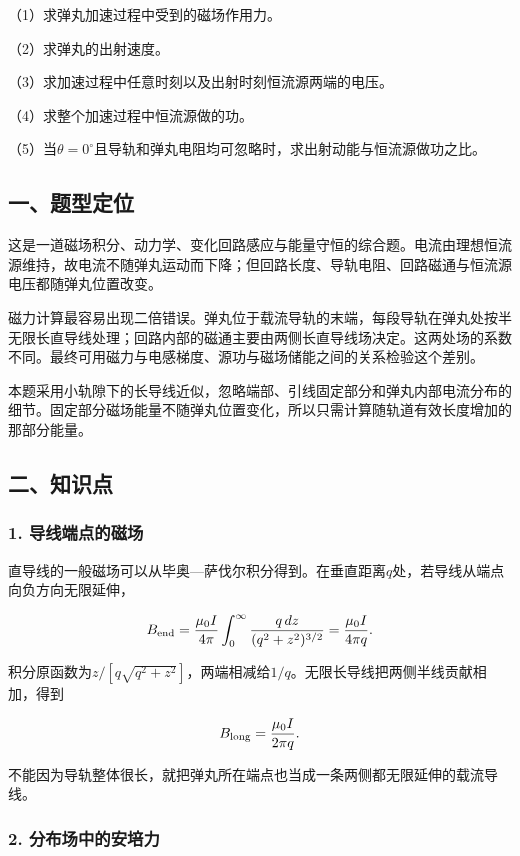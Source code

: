 \documentclass[12pt,a4paper,fontset=fandol]{ctexart}
\begin{document}
（1）求弹丸加速过程中受到的磁场作用力。

（2）求弹丸的出射速度。

（3）求加速过程中任意时刻以及出射时刻恒流源两端的电压。

（4）求整个加速过程中恒流源做的功。

（5）当\(\theta=0^\circ\)且导轨和弹丸电阻均可忽略时，求出射动能与恒流源做功之比。

\subsection{一、题型定位}\label{ux4e00ux9898ux578bux5b9aux4f4d-2}

这是一道磁场积分、动力学、变化回路感应与能量守恒的综合题。电流由理想恒流源维持，故电流不随弹丸运动而下降；但回路长度、导轨电阻、回路磁通与恒流源电压都随弹丸位置改变。

磁力计算最容易出现二倍错误。弹丸位于载流导轨的末端，每段导轨在弹丸处按半无限长直导线处理；回路内部的磁通主要由两侧长直导线场决定。这两处场的系数不同。最终可用磁力与电感梯度、源功与磁场储能之间的关系检验这个差别。

本题采用小轨隙下的长导线近似，忽略端部、引线固定部分和弹丸内部电流分布的细节。固定部分磁场能量不随弹丸位置变化，所以只需计算随轨道有效长度增加的那部分能量。

\subsection{二、知识点}\label{ux4e8cux77e5ux8bc6ux70b9-2}

\subsubsection{1.
导线端点的磁场}\label{ux5bfcux7ebfux7aefux70b9ux7684ux78c1ux573a}

直导线的一般磁场可以从毕奥---萨伐尔积分得到。在垂直距离\(q\)处，若导线从端点向负方向无限延伸，

\[
B_{\rm end}
=\frac{\mu_0I}{4\pi}
\int_0^\infty\frac{q\,dz}{(q^2+z^2)^{3/2}}
=\frac{\mu_0I}{4\pi q}.
\]

积分原函数为\(z/[q\sqrt{q^2+z^2}]\)，两端相减给\(1/q\)。无限长导线把两侧半线贡献相加，得到

\[
B_{\rm long}=\frac{\mu_0I}{2\pi q}.
\]

不能因为导轨整体很长，就把弹丸所在端点也当成一条两侧都无限延伸的载流导线。

\subsubsection{2.
分布场中的安培力}\label{ux5206ux5e03ux573aux4e2dux7684ux5b89ux57f9ux529b}
\end{document}
